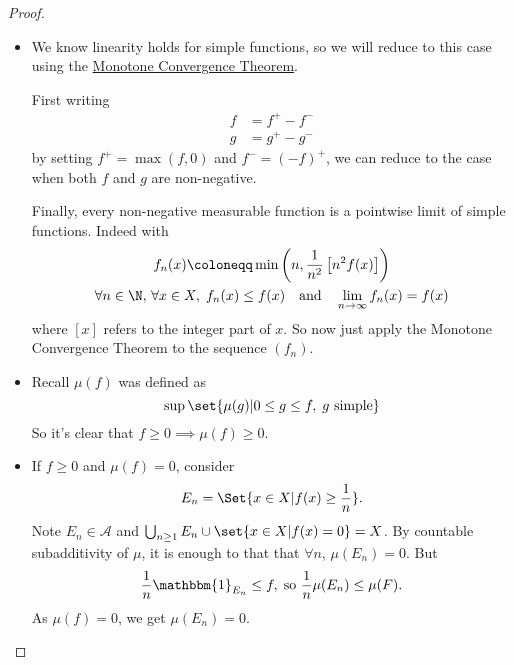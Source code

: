 \documentclass{article}
\newcommand{\1}[1]{\mathbbm{1}_{#1}}
\begin{document}
\begin{proof}
    \leavevmode
    \begin{itemize}
        \item We know linearity holds for simple functions, so we will reduce to this case using the \hyperlink{def:monConv}{Monotone Convergence Theorem}.

            First writing
            \begin{align*}
                f &= f^+ - f^- \\
                g &= g^+ - g^-
            \end{align*}
            by setting $f^+ = \max(f, 0)$ and $f^- = (-f)^+$, we can reduce to the case when both $f$ and $g$ are non-negative.

            Finally, every non-negative measurable function is a pointwise limit of simple functions. Indeed with
            \begin{gather*}
                f_n(x) \coloneqq \min\left(n, \frac{1}{n^2} \left[n^2 f(x)\right]\right) \\
                \forall n \in \N, \, \forall x \in X, \; f_n(x) \leq f(x) \quad \text{and} \quad \lim_{n \to \infty} f_n(x) = f(x)
            \end{gather*}
            where $[x]$ refers to the integer part of $x$.
            So now just apply the Monotone Convergence Theorem to the sequence $(f_n)$.

        \item Recall $\mu(f)$ was defined as
            \begin{equation*}
                \sup\set{\mu(g) | 0 \leq g \leq f, \; g \ \text{simple}}
            \end{equation*}
            So it's clear that $f \geq 0 \implies \mu(f) \geq 0$.
        \item If $f \geq 0$ and $\mu(f) = 0$, consider
            \begin{equation*}
                E_n = \Set{x \in X| f(x) \geq \frac{1}{n}}.
            \end{equation*}
            Note $E_n \in \mathcal{A}$ and $\bigcup_{n \geq 1} E_n \cup \set{x \in X | f(x) = 0} = X$.
            By countable subadditivity of $\mu$, it is enough to that that $\forall n$, $\mu(E_n) = 0$. But
            \begin{equation*}
                \frac{1}{n} \1{{E_n}} \leq f, \; \text{so} \ \frac{1}{n} \mu(E_n) \leq \mu(F).
            \end{equation*}
            As $\mu(f) = 0$, we get $\mu(E_n) = 0$.
    \end{itemize}
\end{proof}
\end{document}
